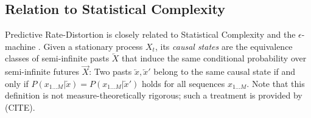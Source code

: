 \documentclass[11pt,letterpaper]{article}
\begin{document}
%
%
%
%
%
%

\subsection{Relation to Statistical Complexity}

Predictive Rate-Distortion is closely related to Statistical Complexity and the $\epsilon$-machine \citep{crutchfield-inferring-1989}.
Given a stationary process $X_t$, its \emph{causal states} are the equivalence classes of semi-infinite pasts $\overleftarrow{X}$ that induce the same conditional probability over semi-infinite futures $\overrightarrow{X}$:
Two pasts $\overleftarrow{x}, \overleftarrow{x}'$ belong to the same causal state if and only if $P(x_{1...M}|\overleftarrow{x}) = P(x_{1...M}|\overleftarrow{x}')$ holds for all sequences $x_{1...M}$.
Note that this definition is not measure-theoretically rigorous; such a treatment is provided by (CITE).
\end{document}
